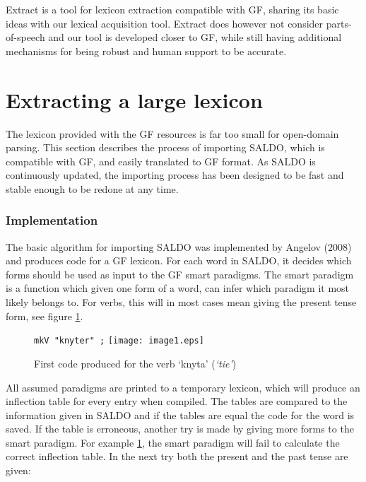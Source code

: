 \documentclass[10pt, a4paper]{article}
\begin{document}
Extract \cite{MarkusForsberg2007} is a tool for lexicon
extraction compatible with GF, sharing its basic ideas with our lexical
acquisition tool. Extract does however not consider parts-of-speech and our
tool is developed closer to GF, while still
having additional mechanisms for being robust and human support to be accurate.


\section{Extracting a large lexicon}
\label{sec:extractsaldo}
The lexicon provided with the GF resources is far too small for open-domain
parsing.
This section describes the process of importing SALDO, which is 
compatible with GF, and easily translated to GF format.
As SALDO is continuously updated, the importing process has been designed to be fast
and stable enough to be redone at any time.

\subsubsection{Implementation}
The basic algorithm for importing SALDO was implemented by Angelov (2008)
and  produces code for a GF lexicon.
For each word in SALDO, it decides which forms should be used as input
to the GF smart paradigms. The smart paradigm is a function which given one
form of a word, can infer which paradigm it most likely belongs to.
For verbs, this will in most cases mean giving
the present tense form, see figure \ref{fig:saldoknyt}. \\

\begin{figure}[h]
\begin{center}
\verb-mkV "knyter" ;-
\texttt{[image: image1.eps]} 
\caption{First code produced for the verb `knyta' (\emph{`tie'})}
\label{fig:saldoknyt}
\end{center}
\end{figure}

All assumed paradigms are printed to a temporary lexicon, 
which will produce an inflection table for every entry when compiled.
The tables are compared to the information given
in SALDO and if the tables are equal the code for the word is saved. If the table
is erroneous, another try is made
by giving more forms to the smart paradigm.
For example \ref{fig:saldoknyt}, the smart paradigm will fail to calculate the
correct inflection table. In the next try both the present and the past tense
are given:\\
\end{document}
